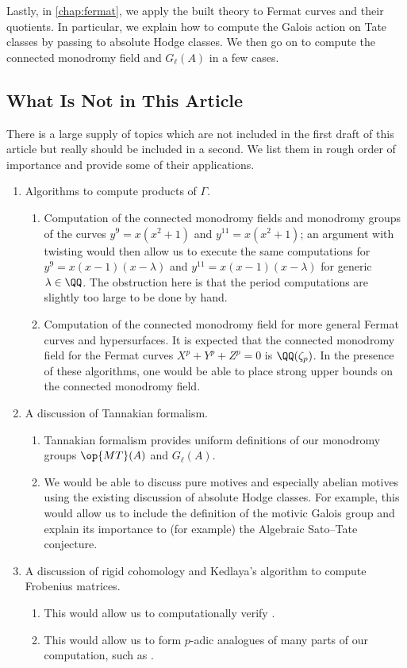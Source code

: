 \documentclass[openany]{book}
\begin{document}
Lastly, in \cref{chap:fermat}, we apply the built theory to Fermat curves and their quotients. In particular, we explain how to compute the Galois action on Tate classes by passing to absolute Hodge classes. We then go on to compute the connected monodromy field and $G_\ell(A)$ in a few cases.

\subsection{What Is Not in This Article}
There is a large supply of topics which are not included in the first draft of this article but really should be included in a second. We list them in rough order of importance and provide some of their applications.
\begin{enumerate}
	\item Algorithms to compute products of $\Gamma$.
	\begin{enumerate}
		\item Computation of the connected monodromy fields and monodromy groups of the curves $y^9=x\left(x^2+1\right)$ and $y^{11}=x\left(x^2+1\right)$; an argument with twisting would then allow us to execute the same computations for $y^9=x(x-1)(x-\lambda)$ and $y^{11}=x(x-1)(x-\lambda)$ for generic $\lambda\in\QQ$. The obstruction here is that the period computations are slightly too large to be done by hand.
		\item Computation of the connected monodromy field for more general Fermat curves and hypersurfaces. It is expected that the connected monodromy field for the Fermat curves $X^p+Y^p+Z^p=0$ is $\QQ(\zeta_p)$. In the presence of these algorithms, one would be able to place strong upper bounds on the connected monodromy field.
	\end{enumerate}
	\item A discussion of Tannakian formalism.
	\begin{enumerate}
		\item Tannakian formalism provides uniform definitions of our monodromy groups $\op{MT}(A)$ and $G_\ell(A)$.
		\item We would be able to discuss pure motives and especially abelian motives using the existing discussion of absolute Hodge classes. For example, this would allow us to include the definition of the motivic Galois group and explain its importance to (for example) the Algebraic Sato--Tate conjecture.
	\end{enumerate}
	\item A discussion of rigid cohomology and Kedlaya's algorithm to compute Frobenius matrices.
	\begin{enumerate}
		\item This would allow us to computationally verify .
		\item This would allow us to form $p$-adic analogues of many parts of our computation, such as .
	\end{enumerate}
\end{enumerate}
\end{document}
